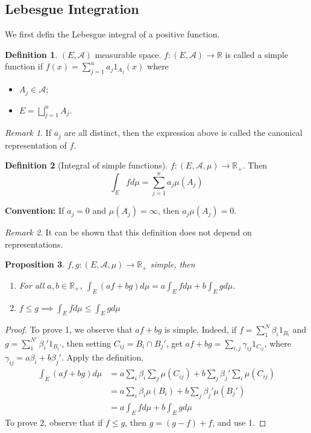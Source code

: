 \documentclass{article}
\theoremstyle{definition}
\newtheorem{defn}{Definition}[section]
\theoremstyle{remark}
\newtheorem{rem}{Remark}
\theoremstyle{plain}
\newtheorem{prop}[defn]{Proposition}
\newcommand{\RR}{\mathbb{R}}
\begin{document}
\subsection{Lebesgue Integration}
We first defin the Lebesgue integral of a positive function.
\begin{defn}
    $(E,\mathcal{A})$ measurable space. $f:(E,\mathcal{A})\to\RR$ is called a simple function if $f(x)=\sum_{j=1}^na_j1_{A_j}(x)$ where
    \begin{itemize}
        \item $A_j\in\mathcal{A}$;
        \item $E=\bigsqcup_{j=1}^n A_j$.
    \end{itemize}
\end{defn}
\begin{rem}
    If $a_j$ are all distinct, then the expression above is called the canonical representation of $f$.
\end{rem}
\begin{defn}[Integral of simple functions]
    $f:(E,\mathcal{A},\mu)\to\RR_+$. Then \[\int_E fd\mu=\sum_{j=1}^na_j\mu(A_j)\]
\end{defn}
\textbf{Convention:} If $a_j=0$ and $\mu(A_j)=\infty$, then $a_j\mu(A_j)=0$.
\begin{rem}
    It can be shown that this definition does not depend on representations.
\end{rem}
\begin{prop}
    $f,g:(E,\mathcal{A},\mu)\to\RR_+$ simple, then
    \begin{enumerate}
        \item For all $a,b\in\RR_+$, $\int_E(af+bg)d\mu=a\int_E fd\mu+b\int_E gd\mu$.
        \item $f\le g\implies \int_E fd\mu\le \int_E gd\mu$
    \end{enumerate}
\end{prop}
\begin{proof}
    To prove 1, we observe that $af+bg$ is simple. Indeed, if $f=\sum_1^N\beta_i1_{B_i}$ and $g=\sum_1^{N'}\beta_i'1_{B_i'}$, then setting $C_{ij}=B_i\cap B_j'$, get $af+bg=\sum_{i,j}\gamma_{ij}1_{C_{ij}}$, where $\gamma_{ij}=a\beta_i+b\beta_j'$. Apply the definition,
    \begin{align*}
        \int_E(af+bg)d\mu&=a\sum_i\beta_i\sum_j\mu(C_{ij})+b\sum_j\beta_j'\sum_i\mu(C_{ij})\\
        &=a\sum_i\beta_i\mu(B_i)+b\sum_j\beta_j'\mu(B_j')\\
        &=a\int_Efd\mu+b\int_Egd\mu
    \end{align*}
    To prove 2, observe that if $f\le g$, then $g=(g-f)+f$, and use 1.
\end{proof}
\end{document}
